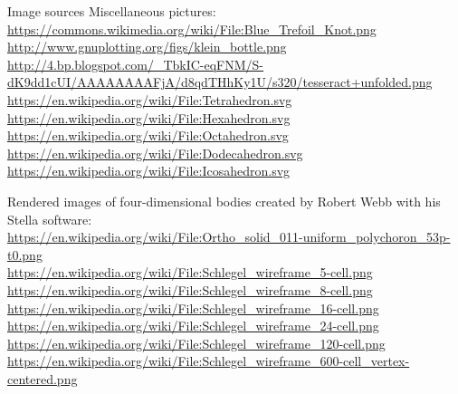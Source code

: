 \documentclass[12pt,compress,ngerman,utf8,t]{beamer}
\begin{document}
\begin{frame}{Image sources}
  \tiny
  Miscellaneous pictures: \\
  \url{https://commons.wikimedia.org/wiki/File:Blue_Trefoil_Knot.png} \\
  \url{http://www.gnuplotting.org/figs/klein_bottle.png} \\
  \url{http://4.bp.blogspot.com/_TbkIC-eqFNM/S-dK9dd1cUI/AAAAAAAAFjA/d8qdTHhKy1U/s320/tesseract+unfolded.png} \\
  \url{https://en.wikipedia.org/wiki/File:Tetrahedron.svg} \\
  \url{https://en.wikipedia.org/wiki/File:Hexahedron.svg} \\
  \url{https://en.wikipedia.org/wiki/File:Octahedron.svg} \\
  \url{https://en.wikipedia.org/wiki/File:Dodecahedron.svg} \\
  \url{https://en.wikipedia.org/wiki/File:Icosahedron.svg}
  \bigskip

  Rendered images of four-dimensional bodies created by Robert Webb with his
  Stella software: \\
  \url{https://en.wikipedia.org/wiki/File:Ortho_solid_011-uniform_polychoron_53p-t0.png} \\
  \url{https://en.wikipedia.org/wiki/File:Schlegel_wireframe_5-cell.png} \\
  \url{https://en.wikipedia.org/wiki/File:Schlegel_wireframe_8-cell.png} \\
  \url{https://en.wikipedia.org/wiki/File:Schlegel_wireframe_16-cell.png} \\
  \url{https://en.wikipedia.org/wiki/File:Schlegel_wireframe_24-cell.png} \\
  \url{https://en.wikipedia.org/wiki/File:Schlegel_wireframe_120-cell.png} \\
  \url{https://en.wikipedia.org/wiki/File:Schlegel_wireframe_600-cell_vertex-centered.png} \\
\end{frame}
\addtocounter{framenumber}{-1}
\end{document}
